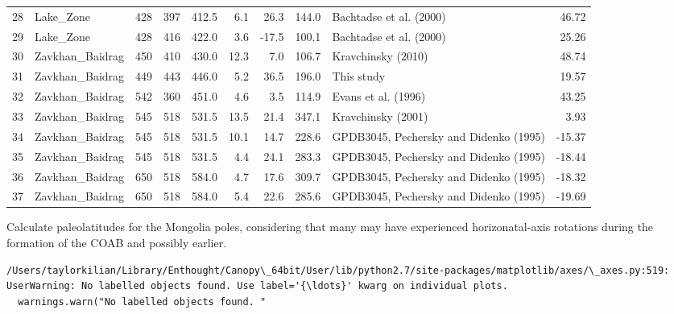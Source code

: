 \documentclass[11pt]{article}
\begin{document}
\begin{sidewaystable}
{\begin{tabular}{llrrrrrrlr}
28 &          Lake\_Zone &       428 &      397 &       412.5 &   6.1 &  26.3 &  144.0 &                 Bachtadse et al. (2000) &     46.72 \\
29 &          Lake\_Zone &       428 &      416 &       422.0 &   3.6 & -17.5 &  100.1 &                 Bachtadse et al. (2000) &     25.26 \\
30 &    Zavkhan\_Baidrag &       450 &      410 &       430.0 &  12.3 &   7.0 &  106.7 &                      Kravchinsky (2010) &     48.74 \\
31 &    Zavkhan\_Baidrag &       449 &      443 &       446.0 &   5.2 &  36.5 &  196.0 &                              This study &     19.57 \\
32 &    Zavkhan\_Baidrag &       542 &      360 &       451.0 &   4.6 &   3.5 &  114.9 &                     Evans et al. (1996) &     43.25 \\
33 &    Zavkhan\_Baidrag &       545 &      518 &       531.5 &  13.5 &  21.4 &  347.1 &                      Kravchinsky (2001) &      3.93 \\
34 &    Zavkhan\_Baidrag &       545 &      518 &       531.5 &  10.1 &  14.7 &  228.6 &  GPDB3045, Pechersky and Didenko (1995) &    -15.37 \\
35 &    Zavkhan\_Baidrag &       545 &      518 &       531.5 &   4.4 &  24.1 &  283.3 &  GPDB3045, Pechersky and Didenko (1995) &    -18.44 \\
36 &    Zavkhan\_Baidrag &       650 &      518 &       584.0 &   4.7 &  17.6 &  309.7 &  GPDB3045, Pechersky and Didenko (1995) &    -18.32 \\
37 &    Zavkhan\_Baidrag &       650 &      518 &       584.0 &   5.4 &  22.6 &  285.6 &  GPDB3045, Pechersky and Didenko (1995) &    -19.69 \\
\bottomrule
\end{tabular}}
\end{sidewaystable}
    


    Calculate paleolatitudes for the Mongolia poles, considering that many
may have experienced horizonatal-axis rotations during the formation of
the COAB and possibly earlier.



    \begin{Verbatim}[commandchars=\\\{\}]
/Users/taylorkilian/Library/Enthought/Canopy\_64bit/User/lib/python2.7/site-packages/matplotlib/axes/\_axes.py:519: UserWarning: No labelled objects found. Use label='{\ldots}' kwarg on individual plots.
  warnings.warn("No labelled objects found. "

    \end{Verbatim}
\end{document}
